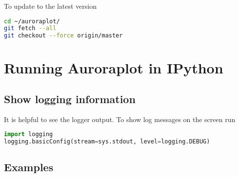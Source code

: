\documentclass{article}
\begin{document}
To update to the latest version
\begin{lstlisting}[language=Bash]
cd ~/auroraplot/
git fetch --all
git checkout --force origin/master
\end{lstlisting}


\section{Running Auroraplot in IPython}
\subsection{Show logging information}
It is helpful to see the logger output. To show log messages on the screen run
\begin{lstlisting}[language=Python]
import logging
logging.basicConfig(stream=sys.stdout, level=logging.DEBUG)
\end{lstlisting}

\subsection{Examples}
\end{document}

